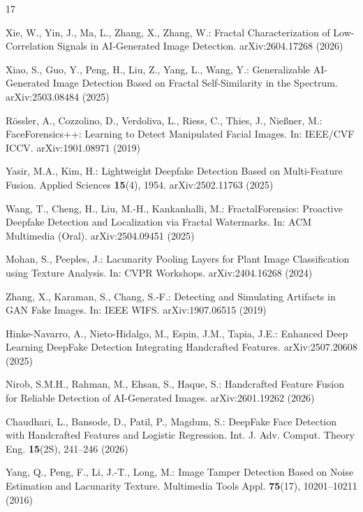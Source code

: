 \documentclass[runningheads]{llncs}
\begin{document}
\begin{thebibliography}{17}

Xie, W., Yin, J., Ma, L., Zhang, X., Zhang, W.:
Fractal Characterization of Low-Correlation Signals in AI-Generated Image Detection.
arXiv:2604.17268 (2026)

Xiao, S., Guo, Y., Peng, H., Liu, Z., Yang, L., Wang, Y.:
Generalizable AI-Generated Image Detection Based on Fractal Self-Similarity in the Spectrum.
arXiv:2503.08484 (2025)

R\"{o}ssler, A., Cozzolino, D., Verdoliva, L., Riess, C., Thies, J., Nie{\ss}ner, M.:
FaceForensics++: Learning to Detect Manipulated Facial Images.
In: IEEE/CVF ICCV. arXiv:1901.08971 (2019)

Yasir, M.A., Kim, H.:
Lightweight Deepfake Detection Based on Multi-Feature Fusion.
Applied Sciences \textbf{15}(4), 1954. arXiv:2502.11763 (2025)

Wang, T., Cheng, H., Liu, M.-H., Kankanhalli, M.:
FractalForensics: Proactive Deepfake Detection and Localization via Fractal Watermarks.
In: ACM Multimedia (Oral). arXiv:2504.09451 (2025)

Mohan, S., Peeples, J.:
Lacunarity Pooling Layers for Plant Image Classification using Texture Analysis.
In: CVPR Workshops. arXiv:2404.16268 (2024)

Zhang, X., Karaman, S., Chang, S.-F.:
Detecting and Simulating Artifacts in GAN Fake Images.
In: IEEE WIFS. arXiv:1907.06515 (2019)

Hinke-Navarro, A., Nieto-Hidalgo, M., Espin, J.M., Tapia, J.E.:
Enhanced Deep Learning DeepFake Detection Integrating Handcrafted Features.
arXiv:2507.20608 (2025)

Nirob, S.M.H., Rahman, M., Ehsan, S., Haque, S.:
Handcrafted Feature Fusion for Reliable Detection of AI-Generated Images.
arXiv:2601.19262 (2026)

Chaudhari, L., Bansode, D., Patil, P., Magdum, S.:
DeepFake Face Detection with Handcrafted Features and Logistic Regression.
Int. J. Adv. Comput. Theory Eng. \textbf{15}(2S), 241--246 (2026)

Yang, Q., Peng, F., Li, J.-T., Long, M.:
Image Tamper Detection Based on Noise Estimation and Lacunarity Texture.
Multimedia Tools Appl. \textbf{75}(17), 10201--10211 (2016)


\end{thebibliography}
\end{document}
